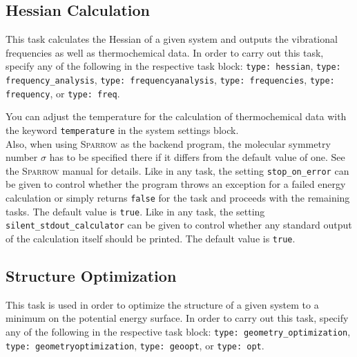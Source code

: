 \documentclass[]{tufte-book}
\begin{document}
\subsection{Hessian Calculation}

This task calculates the Hessian of a given system and outputs the vibrational frequencies as well as thermochemical data.
In order to carry out this task, specify any of the following in the respective task block: \texttt{type: hessian},
\texttt{type: frequency\_analysis}, \texttt{type: frequencyanalysis}, \texttt{type: frequencies}, \texttt{type: frequency},
or \texttt{type: freq}.

You can adjust the temperature for the calculation of thermochemical data with the keyword \texttt{temperature} in the system settings block.\\
Also, when using \textsc{Sparrow} %
as the backend program, the molecular symmetry number $\sigma$ has to be specified there if it differs from the
default value of one. See the \textsc{Sparrow} manual for details.
Like in any task, the setting \texttt{stop\_on\_error} can be given to control whether the program throws an exception for a failed energy calculation or simply returns \texttt{false} for the task and proceeds with the remaining tasks. The default value is \texttt{true}.
Like in any task, the setting \texttt{silent\_stdout\_calculator} can be given to control whether any standard output of the calculation itself should be printed. The default value is \texttt{true}.

\subsection{Structure Optimization}

This task is used in order to optimize the structure of a given system to a minimum on the potential energy surface. In
order to carry out this task, specify any of the following in the respective task block: \texttt{type: geometry\_optimization},
\texttt{type: geometryoptimization}, \texttt{type: geoopt}, or \texttt{type: opt}.
\end{document}
